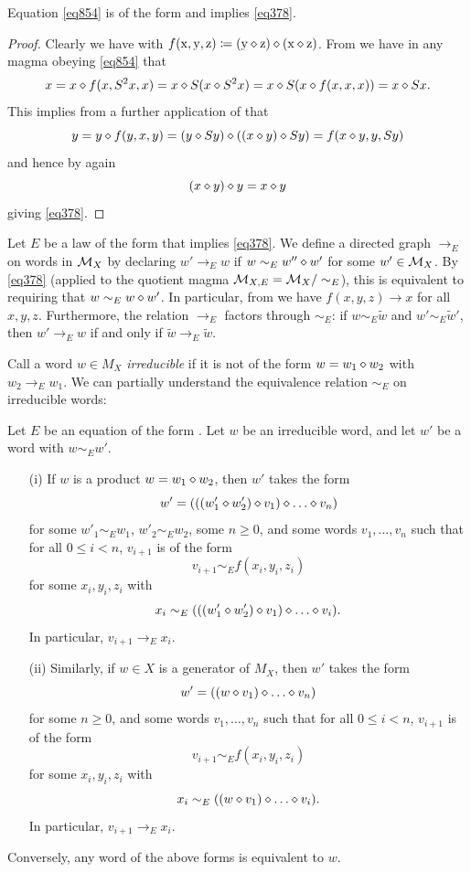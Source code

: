 \begin{lemma}\label{854} Equation \eqref{eq854} is of the form  and implies \eqref{eq378}.
\end{lemma}

\begin{proof}  Clearly we have  with $f(\mathrm{x},\mathrm{y},\mathrm{z}) \coloneqq (\mathrm{y} \diamond \mathrm{z}) \diamond (\mathrm{x} \diamond \mathrm{z})$.  From  we have in any magma obeying \eqref{eq854} that
$$x = x \diamond f(x,S^2 x,x) = x \diamond S(x \diamond S^2 x) = x \diamond S(x \diamond f(x,x,x)) = x \diamond Sx.$$
This implies from a further application of  that
$$ y = y \diamond f(y,x,y) = (y \diamond Sy) \diamond ((x \diamond y) \diamond Sy) = f(x \diamond y, y, Sy)$$
and hence by  again
$$ (x \diamond y) \diamond y = x \diamond y$$
giving \eqref{eq378}.
\end{proof}

Let $E$ be a law of the form  that implies \eqref{eq378}. We define a directed graph $\to_E$ on words in ${\mathcal{M}}_X$ by declaring $w' \to_E w$ if $w \sim_E w'' \diamond w'$ for some $w' \in {\mathcal{M}}_X$.  By \eqref{eq378} (applied to the quotient magma ${\mathcal{M}}_{X,E} = {\mathcal{M}}_X/\sim_E$), this is equivalent to requiring that $w \sim_E w \diamond w'$. In particular, from  we have $f(x,y,z) \to x$ for all $x,y,z$.  Furthermore, the relation $\to_E$ factors through $\sim_E$: if $w \sim_E \tilde w$ and $w' \sim_E \tilde w'$, then $w' \to_E w$ if and only if $\tilde w \to_E \tilde w$.

Call a word $w \in M_X$ \emph{irreducible} if it is not of the form $w = w_1 \diamond w_2$ with $w_2 \to_E w_1$.  We can partially understand the equivalence relation $\sim_E$ on irreducible words:

\begin{theorem}\label{irred-desc}  Let $E$ be an equation of the form .  Let $w$ be an irreducible word, and let $w'$ be a word with $w \sim_E w'$.
  \begin{itemize}
    \item[(i)] If $w$ is a product $w = w_1 \diamond w_2$, then $w'$ takes the form
$$ w' = (((w'_1 \op w'_2) \op v_1) \op \dots \op v_n)$$
for some $w'_1 \sim_E w_1$, $w'_2 \sim_E w_2$, some $n \geq 0$, and some words $v_1, \dots, v_n$ such that for all $0 \leq i < n$, $v_{i+1}$ is of the form
$$ v_{i+1} \sim_E f(x_i,y_i,z_i)$$
for some $x_i, y_i, z_i$ with
$$ x_i \sim_E (((w'_1 \op w'_2) \op v_1) \op \dots \op v_i).$$
In particular, $v_{i+1} \to_E x_i$.
  \item[(ii)] Similarly, if $w \in X$ is a generator of $M_X$, then $w'$ takes the form
$$ w' = ((w \op v_1) \op \dots \op v_n)$$
for some $n \geq 0$, and some words $v_1, \dots, v_n$ such that for all $0 \leq i < n$, $v_{i+1}$ is of the form
$$ v_{i+1} \sim_E f(x_i,y_i,z_i)$$
for some $x_i, y_i, z_i$ with
$$ x_i \sim_E ((w \op v_1) \op \dots \op v_i).$$
In particular, $v_{i+1} \to_E x_i$.
\end{itemize}
Conversely, any word of the above forms is equivalent to $w$.
\end{theorem}

